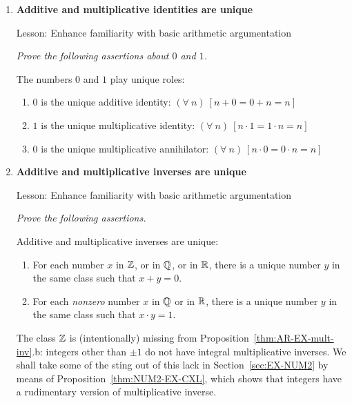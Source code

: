 \begin{enumerate}
\item
{\bf Additive and multiplicative identities are unique}

{\sc Lesson:} Enhance familiarity with basic arithmetic argumentation

\smallskip  

{\em Prove the following assertions about $0$ and $1$.}

\begin{prop}
The numbers $0$ and $1$ play unique roles:
\begin{enumerate}
\item
$0$ is the unique additive identity: $(\forall \ n) \ [n+0 = 0 + n = n]$
\medskip\item 
$1$ is the unique multiplicative identity: $(\forall \ n) \ [n \cdot 1 = 1 \cdot n = n]$
\medskip\item
$0$ is the unique multiplicative annihilator: $(\forall \ n) \ [n \cdot 0 = 0 \cdot n = n]$
\end{enumerate}
\end{prop}

\medskip\item
{\bf Additive and multiplicative inverses are unique}

{\sc Lesson:} Enhance familiarity with basic arithmetic argumentation

\smallskip  

{\em Prove the following assertions.}

\begin{prop}
\label{thm:AR-EX-mult-inv}
Additive and multiplicative inverses are unique:
\begin{enumerate}
\item
For each number $x$ in $\mathbb{Z}$, or in $\mathbb{Q}$, or in $\mathbb{R}$, there is a unique number $y$ in the same class such that $x + y = 0$.
\medskip\item 
For each {\em nonzero} number $x$ in $\mathbb{Q}$ or in $\mathbb{R}$, there is a unique number $y$ in the same class such that $x \cdot y = 1$.
\end{enumerate}
\end{prop}

The class $\mathbb{Z}$ is (intentionally) missing from Proposition~\ref{thm:AR-EX-mult-inv}.b: integers other than $\pm 1$ do not have integral multiplicative inverses.  We shall take some of the sting out of this lack in 
Section~\ref{sec:EX-NUM2} by means of Proposition~\ref{thm:NUM2-EX-CXL}, which shows that integers have a rudimentary version of multiplicative inverse.
\medskip


\end{enumerate}
